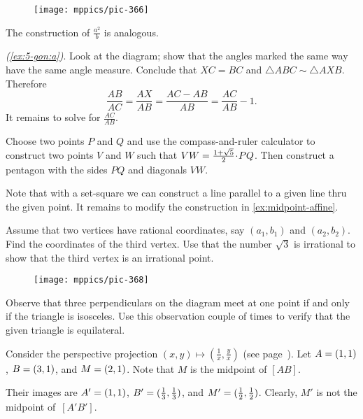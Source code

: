 {

\begin{wrapfigure}{r}{27mm}
\vskip-3mm
\centering
\texttt{[image: mppics/pic-366]}
\end{wrapfigure}

The construction of $\tfrac{a^2}b$ is analogous.


\parbf{\ref{ex:5-gon},} \textit{(\ref{ex:5-gon:a})}.
Look at the diagram;
show that the angles marked the same way have the same angle measure.
Conclude that $XC=BC$ and $\triangle ABC\sim \triangle AXB$.
Therefore 
\[\frac{AB}{AC}=\frac{AX}{AB}=\frac{AC-AB}{AB}=\frac{AC}{AB}-1.\]
It remains to solve for $\frac{AC}{AB}$.

}

 Choose two points $P$ and $Q$ and use the compass-and-ruler calculator to construct two points $V$ and $W$ such that $VW\z=\tfrac{1+\sqrt5}2\cdot PQ$.
Then construct a pentagon with the sides $PQ$ and diagonals $VW$.

Note that with a set-square we can construct a line parallel to a given line thru the given point.
It remains to modify the construction in \ref{ex:midpoint-affine}.

Assume that two vertices have rational coordinates, say $(a_1,b_1)$ and $(a_2,b_2)$.
Find the coordinates of the third vertex.
Use that the number $\sqrt{3}$ is irrational
to show that the third vertex is an irrational point.

{

\begin{wrapfigure}{r}{23mm}
\vskip-5mm
\centering
\texttt{[image: mppics/pic-368]}
\end{wrapfigure}

Observe that three perpendiculars on the diagram meet at one point if and only if the triangle is isosceles.
Use this observation couple of times to verify that the given triangle is equilateral.

Consider the perspective projection 
$(x,y)\mapsto (\tfrac 1x,\tfrac yx)$ (see page~\pageref{eq:(x,y)-perspective}).
Let $A\z=(1,1)$, $B\z=(3,1)$, and $M\z=(2,1)$.
Note that $M$ is the midpoint of $[AB]$.

Their images are $A'\z=(1,1)$, $B'\z=(\tfrac13,\tfrac13)$, and $M'\z=(\tfrac12,\tfrac12)$.
Clearly, $M'$ is not the midpoint of~$[A'B']$.

}

